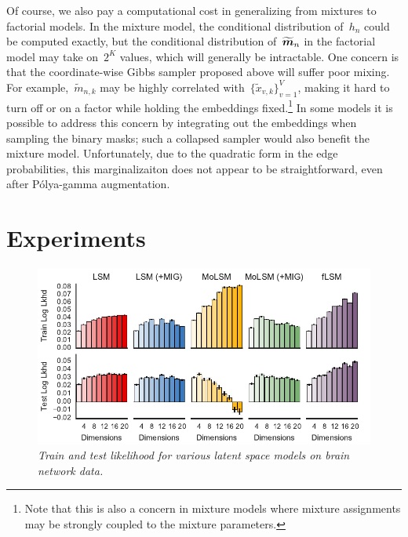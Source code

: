 Of course, we also pay a computational cost in generalizing from
mixtures to factorial models.  In the mixture model, the conditional
distribution of~$h_n$ could be computed exactly, but the conditional
distribution of~$\widetilde{\boldsymbol{m}}_n$ in the factorial model may take
on~$2^K$ values, which will generally be intractable.  One concern is
that the coordinate-wise Gibbs sampler proposed above will suffer poor
mixing. For example,~$\widetilde{m}_{n,k}$ may be highly correlated
with~$\{\widetilde{x}_{v,k}\}_{v=1}^V$, making it hard to turn off
or on a factor while holding the embeddings fixed.\footnote{Note that
  this is also a concern in mixture models where mixture assignments
  may be strongly coupled to the mixture parameters.} In some models
it is possible to address this concern by integrating out the
embeddings when sampling the binary masks; such a collapsed sampler
would also benefit the mixture model.  Unfortunately, due to the
quadratic form in the edge probabilities, this marginalizaiton
does not appear to be straightforward, even after P\'{o}lya-gamma
augmentation.

\section{Experiments}

\begin{figure}[t]
\includegraphics[width=\linewidth]{figures/lls.pdf}
\caption{\textit{Train and test likelihood for various
  latent space models on brain network data.}}
\label{fig:lls}
\end{figure}

